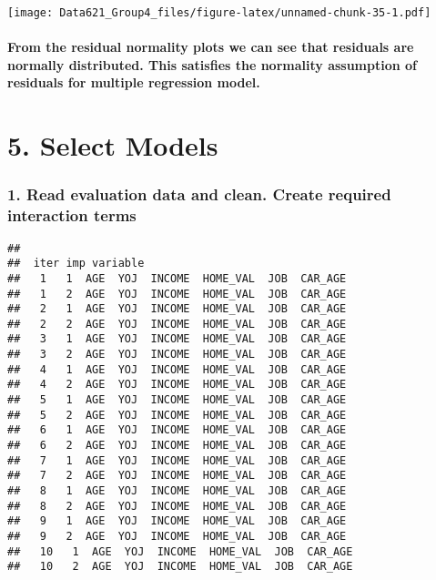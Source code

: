 \documentclass[]{article}
\newenvironment{Shaded}{\begin{snugshade}}{\end{snugshade}}
\newcommand{\KeywordTok}[1]{\textcolor[rgb]{0.13,0.29,0.53}{\textbf{#1}}}
\newcommand{\NormalTok}[1]{#1}
\newcommand{\OperatorTok}[1]{\textcolor[rgb]{0.81,0.36,0.00}{\textbf{#1}}}
\let\oldparagraph\paragraph
\renewcommand{\paragraph}[1]{\oldparagraph{#1}\mbox{}}
\begin{document}
\begin{Shaded}
\end{Shaded}

\texttt{[image: Data621\_Group4\_files/figure-latex/unnamed-chunk-35-1.pdf]}

\hypertarget{from-the-residual-normality-plots-we-can-see-that-residuals-are-normally-distributed.-this-satisfies-the-normality-assumption-of-residuals-for-multiple-regression-model.}{%
\paragraph{From the residual normality plots we can see that residuals
are normally distributed. This satisfies the normality assumption of
residuals for multiple regression
model.}\label{from-the-residual-normality-plots-we-can-see-that-residuals-are-normally-distributed.-this-satisfies-the-normality-assumption-of-residuals-for-multiple-regression-model.}}

\hypertarget{select-models}{%
\section{5. Select Models}\label{select-models}}

\hypertarget{read-evaluation-data-and-clean.-create-required-interaction-terms}{%
\subsubsection{\texorpdfstring{\textbf{1. Read evaluation data and
clean. Create required interaction
terms}}{1. Read evaluation data and clean. Create required interaction terms}}\label{read-evaluation-data-and-clean.-create-required-interaction-terms}}

\begin{verbatim}
## 
##  iter imp variable
##   1   1  AGE  YOJ  INCOME  HOME_VAL  JOB  CAR_AGE
##   1   2  AGE  YOJ  INCOME  HOME_VAL  JOB  CAR_AGE
##   2   1  AGE  YOJ  INCOME  HOME_VAL  JOB  CAR_AGE
##   2   2  AGE  YOJ  INCOME  HOME_VAL  JOB  CAR_AGE
##   3   1  AGE  YOJ  INCOME  HOME_VAL  JOB  CAR_AGE
##   3   2  AGE  YOJ  INCOME  HOME_VAL  JOB  CAR_AGE
##   4   1  AGE  YOJ  INCOME  HOME_VAL  JOB  CAR_AGE
##   4   2  AGE  YOJ  INCOME  HOME_VAL  JOB  CAR_AGE
##   5   1  AGE  YOJ  INCOME  HOME_VAL  JOB  CAR_AGE
##   5   2  AGE  YOJ  INCOME  HOME_VAL  JOB  CAR_AGE
##   6   1  AGE  YOJ  INCOME  HOME_VAL  JOB  CAR_AGE
##   6   2  AGE  YOJ  INCOME  HOME_VAL  JOB  CAR_AGE
##   7   1  AGE  YOJ  INCOME  HOME_VAL  JOB  CAR_AGE
##   7   2  AGE  YOJ  INCOME  HOME_VAL  JOB  CAR_AGE
##   8   1  AGE  YOJ  INCOME  HOME_VAL  JOB  CAR_AGE
##   8   2  AGE  YOJ  INCOME  HOME_VAL  JOB  CAR_AGE
##   9   1  AGE  YOJ  INCOME  HOME_VAL  JOB  CAR_AGE
##   9   2  AGE  YOJ  INCOME  HOME_VAL  JOB  CAR_AGE
##   10   1  AGE  YOJ  INCOME  HOME_VAL  JOB  CAR_AGE
##   10   2  AGE  YOJ  INCOME  HOME_VAL  JOB  CAR_AGE
\end{verbatim}
\end{document}
